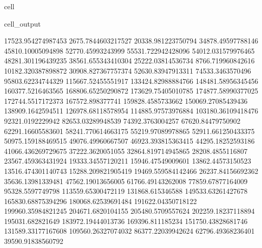 \documentclass[letterpaper,10pt,english]{jupyterBook}
\begin{document}
\begin{sphinxuseclass}{cell}
\begin{sphinxVerbatimOutput}
\begin{sphinxuseclass}{cell_output}
\begin{sphinxVerbatim}[commandchars=\\\{\}]
17523.954274987453  \PYGZhy{}2675.7844603217527  \PYGZhy{}20338.981223750794  \PYGZhy{}34878.49597788146  \PYGZhy{}45810.10005094898  \PYGZhy{}52770.45993243999  \PYGZhy{}55531.722942428096  \PYGZhy{}54012.031579976465  \PYGZhy{}48281.301196439235  \PYGZhy{}38561.655343410304  \PYGZhy{}25222.03814536734  \PYGZhy{}8766.719960842616  10182.320387898872  30908.827367757374  52630.83947913311  74533.3463570496  95803.62234744329  115667.52455551917  133424.82988884766  148481.58956345456  160377.5216463565  168806.65250290872  173629.75405010785  174877.58990377025  172744.5517172373  167572.898377741  159828.4585733662  150069.27085439436  138909.1642594511  126978.68118578954  114885.97573976884  103180.36109418476  92321.0192229942  82653.03289948539  74392.3763004257  67620.84479750902  62291.16605583601  58241.770614663175  55219.97089978865  52911.661250433375  50975.159188469515  49076.49960667507  46923.393815363415  44295.18252593186  41066.436269729675  37222.3620051055  32864.819714945865  28208.4855116807  23567.459363431924  19333.34557120211  15946.47549009601  13862.44573150523  13516.474301140743  15288.209821905419  19469.559584142466  26237.84156692362  35636.13981339481  47562.19013656005  61766.49143262008  77859.67877164009  95328.5597749798  113559.65300472119  131868.615346588  149533.63261427678  165830.68875394296  180068.62539691484  191622.04350718122  199960.35984821245  204671.6820104155  205480.5709557624  202259.18237118894  195031.682821649  183972.19444013736  169396.811185234  151750.43828681746  131589.33177167608  109560.26327074032  86377.22039942624  62796.49368236401  39590.91838560792  

\end{sphinxVerbatim}
\end{sphinxuseclass}
\end{sphinxVerbatimOutput}
\end{sphinxuseclass}
\end{document}
